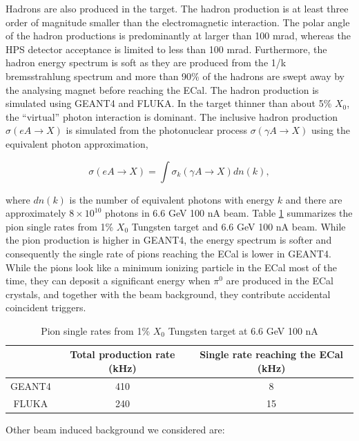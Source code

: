 Hadrons are also produced in the target. The hadron production is at least three order
of magnitude smaller than the electromagnetic interaction. The polar angle of the hadron productions
is predominantly at larger than 100 mrad, whereas the HPS detector acceptance is limited to less than
100 mrad. Furthermore, the hadron energy spectrum is soft as they are produced from the 1/k bremsstrahlung
spectrum and more than 90\% of the hadrons are swept away by the analysing magnet before reaching the ECal.
 The hadron production is simulated using GEANT4 and FLUKA. In the target thinner than
about 5\% $X_0$, the ``virtual'' photon interaction is dominant. \cite{mohring} The inclusive hadron
production ${\sigma (eA\rightarrow X)}$ is simulated from the photonuclear process ${\sigma (\gamma A
\rightarrow X)}$ using the equivalent photon approximation,

$$ \sigma (eA \rightarrow X) = \int \sigma_k(\gamma A \rightarrow X) dn(k), $$

\noindent
where $dn(k)$ is the number of equivalent photons with energy $k$ \cite{budnev} and there are 
approximately $8 \times 10^{10} $ photons in 6.6 GeV 100 nA beam. 
Table \ref{tab:pion} summarizes the pion single rates from 1\% $X_0$ Tungsten target
and 6.6 GeV 100 nA beam. While the pion production is higher in GEANT4, the energy spectrum is softer and
consequently the single rate of pions reaching the ECal is lower in GEANT4. While the pions look like a minimum 
ionizing particle in the ECal most of the time, they can deposit a significant energy when ${\pi^0}$ are
produced in the ECal crystals, and together with the beam background, they contribute accidental coincident triggers. 

\begin{table}[h]
\begin{center}
\begin{tabular}{|c|c|c|} \hline
  & Total production rate (kHz) & Single rate reaching the ECal (kHz) \\ \hline
GEANT4 & 410 & 8 \\ \hline
FLUKA  & 240 & 15 \\ \hline
\end{tabular}
\end{center}
\caption{\small{Pion single rates from 1\% $X_0$ Tungsten target at 6.6 GeV 100 nA}}
\label{tab:pion}
\end{table}

\pagebreak
\noindent
Other beam induced background we considered are:

